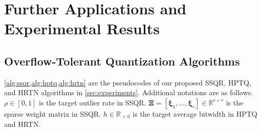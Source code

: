 \documentclass{article} %
\begin{document}
\section{Further Applications and Experimental Results}
\label{sec:app_experiments}

\subsection{Overflow-Tolerant Quantization Algorithms}
\label{sec:app_experiments_algo}

\cref{alg:ssqr,alg:hptq,alg:hrtn} are the pseudocodes of our proposed SSQR, HPTQ, and HRTN algorithms in \cref{sec:experiments}.
Additional notations are as follows.
$\rho \in \left[ 0, 1 \right]$ is the target outlier rate in SSQR.
$\bm{\Xi} = \left[ \bm{\xi}_{1}, \dots, \bm{\xi}_{r} \right] \in \mathbb{R}^{c \times r}$ is the sparse weight matrix in SSQR.
$h \in \mathbb{R}_{>0}$ is the target average bitwidth in HPTQ and HRTN.
\end{document}
